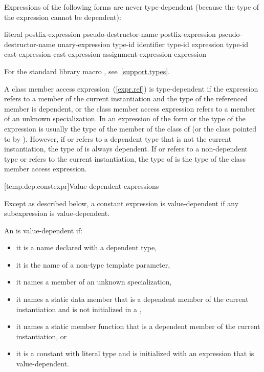 \pnum
Expressions of the following forms are never type-dependent (because the type
of the expression cannot be dependent):

\begin{ncbnftab}
literal\br
postfix-expression  pseudo-destructor-name\br
postfix-expression \terminal{->} pseudo-destructor-name\br
{} unary-expression\br
{} type-id \terminal{)}\br
{}  \terminal{(} identifier \terminal{)}\br
{} type-id \terminal{)}\br
{} expression \terminal{)}\br
{} type-id \terminal{)}\br
{} cast-expression\br
{} cast-expression\br
{} assignment-expression\opt\br
{} \terminal{(} expression \terminal{)}
\end{ncbnftab}

\enternote For the standard library macro ,
see~\ref{support.types}.\exitnote

\pnum
A class member access expression~(\ref{expr.ref}) is
type-dependent if
the expression refers to a member of the current instantiation and
the type of the referenced member is dependent, or the class member access
expression refers to a member of an unknown specialization.
\enternote
In an expression of the form
or
the type of the expression is usually the type of the member
of the class of
(or the class pointed to by
).
However, if
or
refers to a dependent type that is not the current instantiation,
the type of
is always dependent. If
or 
refers to a non-dependent type or refers to the current instantiation, the
type of
is the type of the class member access expression.
\exitnote

[temp.dep.constexpr]{Value-dependent expressions}

\pnum
Except as described below, a constant expression is value-dependent if any
subexpression is value-dependent.

\pnum
An
is value-dependent if:

\begin{itemize}
\item
it is a name declared with a dependent type,
\item
it is the name of a non-type template parameter,
\item
it names a member of an unknown specialization,
\item
it names a static data member that is a dependent member of the current
instantiation and is not initialized in a ,
\item
it names a static member function that is a dependent member of the current
instantiation, or
\item
it is a constant with literal type and is initialized with an
expression that is value-dependent.
\end{itemize}

